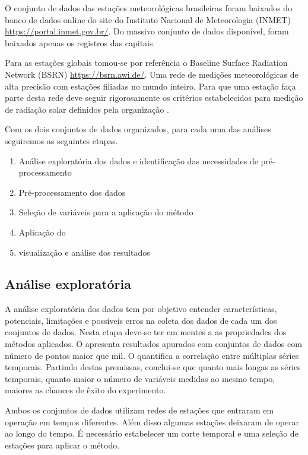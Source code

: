
O conjunto de dados das estações meteorológicas brasileiras foram baixados do banco de dados online do site do Instituto Nacional de Meteorologia (INMET) \url{https://portal.inmet.gov.br/}. Do massivo conjunto de dados disponível, foram baixados apenas os registros das capitais.

Para as estações globais tomou-se por referência o Baseline Surface Radiation Network (BSRN) \url{https://bsrn.awi.de/}. Uma rede de medições meteorológicas de alta precisão com estações filiadas no mundo inteiro. Para que uma estação faça parte desta rede deve seguir rigorosamente os critérios estabelecidos para medição de radiação solar definidos pela organização \cite{Salazar2020}.

Com os dois conjuntos de dados organizados, para cada uma das análises seguiremos as seguintes etapas.

\begin{enumerate}
    \item Análise exploratória dos dados e identificação das necessidades de pré-processamento
    \item Pré-processamento dos dados
    \item Seleção de variáveis para a aplicação do método
    \item Aplicação do \dmc
    \item visualização e análise dos resultados
\end{enumerate}

\subsection{Análise exploratória}

A análise exploratória dos dados tem por objetivo entender características, potenciais, limitações e possíveis erros na coleta dos dados de cada um dos conjuntos de dados. Nesta etapa deve-se ter em mentes a as propriedades dos métodos aplicados. O \pdcca apresenta resultados apurados com conjuntos de dados com número de pontos maior que mil. O \dmc quantifica a correlação entre múltiplas séries temporais. Partindo destas premissas, conclui-se que quanto mais longas as séries temporais, quanto maior o número de variáveis medidas ao mesmo tempo, maiores as chances de êxito do experimento.

Ambos os conjuntos de dados utilizam redes de estações que entraram em operação em tempos diferentes. Além disso algumas estações deixaram de operar ao longo do tempo. É necessário estabelecer um corte temporal e uma seleção de estações para aplicar o método.

